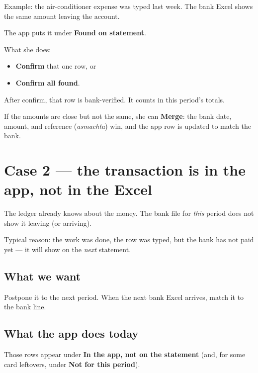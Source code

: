 \documentclass[11pt,a4paper]{article}
\begin{document}
Example: the air-conditioner expense was typed last week.
The bank Excel shows the same amount leaving the account.

The app puts it under \textbf{Found on statement}.

What she does:
\begin{itemize}
  \item \textbf{Confirm} that one row, or
  \item \textbf{Confirm all found}.
\end{itemize}

After confirm, that row is bank-verified.
It counts in this period's totals.

If the amounts are close but not the same, she can \textbf{Merge}:
the bank date, amount, and reference (\emph{asmachta}) win, and the app
row is updated to match the bank.

\section{Case 2 --- the transaction is in the app, not in the Excel}
\label{sec:app-not-excel}

The ledger already knows about the money.
The bank file for \emph{this} period does not show it leaving (or arriving).

Typical reason: the work was done, the row was typed, but the bank has
not paid yet --- it will show on the \emph{next} statement.

\subsection{What we want}

Postpone it to the next period.
When the next bank Excel arrives, match it to the bank line.

\subsection{What the app does today}

Those rows appear under \textbf{In the app, not on the statement}
(and, for some card leftovers, under \textbf{Not for this period}).
\end{document}
